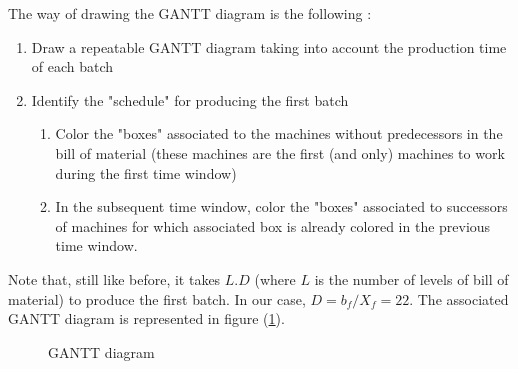 The way of drawing the GANTT diagram is the following : 
\begin{enumerate}
    \item Draw a repeatable GANTT diagram taking into account the production time of each batch
    \item Identify the "schedule" for producing the first batch
    \begin{enumerate}
        \item Color the "boxes" associated to the machines without predecessors in the bill of material (these machines are the first (and only) machines to work during the first time window)
        \item In the subsequent time window, color the "boxes" associated to successors of machines for which associated box is already colored in the previous time window.
    \end{enumerate}
\end{enumerate}

Note that, still like before, it takes $L.D$ (where $L$ is the number of levels of bill of material) to produce the first batch. In our case, $D=b_f/X_f=22$. The associated GANTT diagram is represented in figure (\ref{shared_temp:gantt}).

\begin{figure}
    \caption{\label{shared_temp:gantt}GANTT diagram}
\end{figure}
